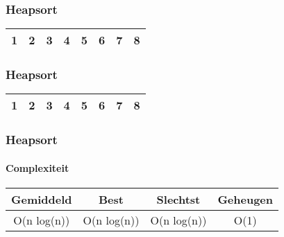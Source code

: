 \begin{frame}
\frametitle{Heapsort}
\begin{table}
\begin{tabular}{| c | c | c | c | c | c | c | c |}
\hline
\cellcolor{red!25}1 & \cellcolor{black!25}2 & \cellcolor{black!25}3 & \cellcolor{black!25}4 & \cellcolor{black!25}5 & \cellcolor{black!25}6 & \cellcolor{black!25}7 & \cellcolor{black!25}8 \\  
\hline
\end{tabular}
\end{table}

\end{frame}

\begin{frame}
\frametitle{Heapsort}
\begin{table}
\begin{tabular}{| c | c | c | c | c | c | c | c |}
\hline
\cellcolor{black!25}1 & \cellcolor{black!25}2 & \cellcolor{black!25}3 & \cellcolor{black!25}4 & \cellcolor{black!25}5 & \cellcolor{black!25}6 & \cellcolor{black!25}7 & \cellcolor{black!25}8 \\  
\hline
\end{tabular}
\end{table}
\end{frame}

\begin{frame}
\frametitle{Heapsort}
\framesubtitle{Complexiteit}
\begin{table}
\begin{tabular}{| c | c | c | c |}
\hline
Gemiddeld & Best & Slechtst & Geheugen\\ 
\hline
O(n log(n)) & O(n log(n)) & O(n log(n)) & O(1)\\
\hline
\end{tabular}
\end{table}
\end{frame}